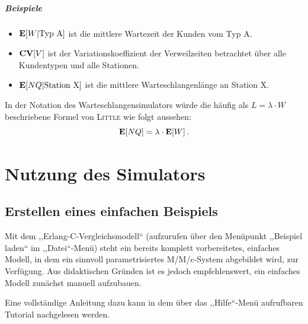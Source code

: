 \documentclass[deutsch]{svmono}
\begin{document}
\paragraph{Beispiele}
\begin{itemize}
\item
${\bf E}[W|\textrm{Typ A}]$
ist die mittlere Wartezeit der Kunden vom Typ A.
\item
${\bf CV}[V]$
ist der Variationskoeffizient der Verweilzeiten betrachtet über alle Kundentypen und alle Stationen.
\item
${\bf E}[NQ|\textrm{Station X}]$
ist die mittlere Warteschlangenlänge an Station X.
\end{itemize}

In der Notation des Warteschlangensimulators würde die häufig als $L=\lambda\cdot W$ beschriebene Formel von \textsc{Little} wie folgt aussehen:
$$
{\bf E}[NQ]=\lambda\cdot{\bf E}[W]\,.
$$



\chapter{Nutzung des Simulators}

\section{Erstellen eines einfachen Beispiels}

Mit dem ,,Erlang-C-Vergleichsmodell`` (aufzurufen über den Menüpunkt ,,Beispiel laden`` im ,,Datei``-Menü) steht ein bereits komplett vorbereitetes, einfaches Modell, in dem ein sinnvoll parametrisiertes M/M/c-System abgebildet wird, zur Verfügung. Aus didaktischen Gründen ist es jedoch empfehlenswert, ein einfaches Modell zunächst manuell aufzubauen.

Eine vollständige Anleitung dazu kann in dem über das ,,Hilfe``-Menü aufrufbaren Tutorial nachgelesen werden.
\end{document}
